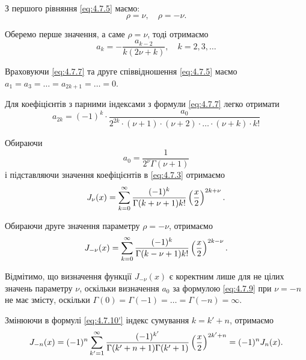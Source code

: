 З першого рівняння \eqref{eq:4.7.5} маємо:
\begin{equation}
	\label{eq:4.7.6}
	\rho = \nu, \quad \rho = - \nu.
\end{equation}

Оберемо перше значення, а саме $\rho = \nu$, тоді отримаємо
\begin{equation}
	\label{eq:4.7.7}
	a_k = - \frac{a_{k - 2}}{k (2 \nu + k)}, \quad k = 2, 3, \ldots
\end{equation}

Враховуючи \eqref{eq:4.7.7} та друге співвідношення \eqref{eq:4.7.5} маємо $a_1 = a_3 = \ldots = a_{2k + 1} = \ldots = 0$. \medskip

Для коефіцієнтів з парними індексами з формули \eqref{eq:4.7.7} легко отримати 
\begin{equation}
	\label{eq:4.7.8}
	a_{2k} = (-1)^k \cdot \frac{a_0}{2^{2k} \cdot (\nu + 1) \cdot (\nu + 2) \cdot \ldots \cdot (\nu + k) \cdot k!}
\end{equation}

Обираючи
\begin{equation}
	\label{eq:4.7.9}
	a_0 = \frac{1}{2^\nu \Gamma(\nu + 1)}
\end{equation}
і підставляючи значення коефіцієнтів в \eqref{eq:4.7.3} отримаємо 
\begin{equation}
	\label{eq:4.7.10}
	J_\nu(x) = \displaystyle\sum\limits_{k = 0}^\infty \frac{(-1)^k}{\Gamma(k + \nu + 1) k!} \left(\frac{x}{2}\right)^{2k + \nu}.
\end{equation}

Обираючи друге значення параметру $\rho = - \nu$, отримаємо 
\begin{equation}
	\label{eq:4.7.10'}
	J_{-\nu}(x) = \displaystyle\sum\limits_{k = 0}^\infty \frac{(-1)^k}{\Gamma(k - \nu + 1) k!} \left(\frac{x}{2}\right)^{2k - \nu}.
\end{equation}

Відмітимо, що визначення функції $J_{-\nu}(x)$ є коректним лише для не цілих значень параметру $\nu$, оскільки визначення $a_0$ за формулою \eqref{eq:4.7.9} при $\nu = - n$ не має змісту, оскільки $\Gamma(0) = \Gamma(-1) = \ldots = \Gamma(-n) = \infty$. \medskip

Змінюючи в формулі \eqref{eq:4.7.10'} індекс сумування $k = k' + n$, отримаємо
\begin{equation}
	\label{eq:4.7.11}
	J_{-n}(x) = (-1)^n \displaystyle\sum\limits_{k'=1}^\infty \frac{(-1)^{k'}}{\Gamma(k'+n+1)\Gamma(k'+1)} \left(\frac{x}{2}\right)^{2k'+n}=(-1)^n J_n(x).
\end{equation}

